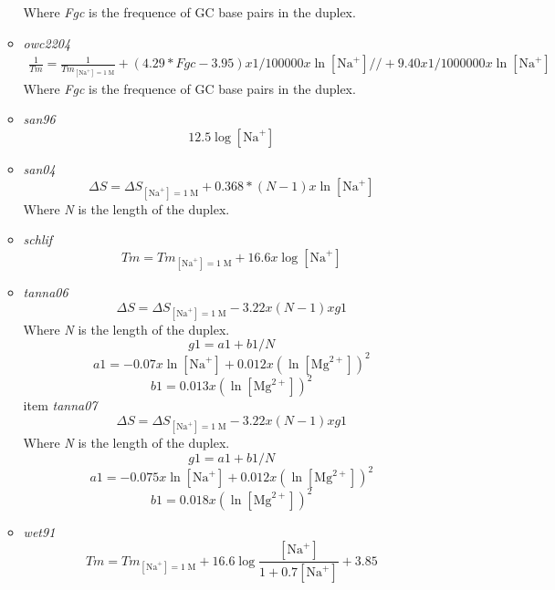 \documentclass{article}
\begin{document}
\begin{itemize}
\begin{itemize}
\begin{displaymath}
 \end{displaymath}
 Where \emph{Fgc} is the frequence of GC base pairs in the duplex.
 \item \textit{owc2204}
 \begin{multline*}
 \frac{1}{Tm}=\frac{1}{Tm_{[\mbox{Na}^+]=1\;\mathrm{M}}}+ (4.29 * Fgc - 3.95) x 1 / 100000 x \ln [\mbox{Na}^+] //
  + 9.40 x 1 / 1000000 x \ln [\mbox{Na}^+]
 \end{multline*}
 Where \emph{Fgc} is the frequence of GC base pairs in the duplex.
 \item \textit{san96}
 \begin{displaymath}
  12.5  \log [\mbox{Na}^+]   
 \end{displaymath}
 \item \textit{san04}
 \begin{displaymath}
  \Delta{}S=\Delta{}S_{[\mbox{Na}^+]=1\;\mathrm{M}}+ 0.368 * (N - 1) x \ln [\mbox{Na}^+]   
 \end{displaymath}
 Where \emph{N} is the length of the duplex.
 \item \textit{schlif}
 \begin{displaymath}
  Tm=Tm_{[\mbox{Na}^+]=1\;\mathrm{M}}+ 16.6 x \log [\mbox{Na}^+]   
 \end{displaymath}
 \item \textit{tanna06}
 \begin{displaymath}
  \Delta{}S=\Delta{}S_{[\mbox{Na}^+]=1\;\mathrm{M}}- 3.22 x (N - 1) x g1  
 \end{displaymath}
 Where \emph{N} is the length of the duplex.
 \begin{displaymath}
  g1=a1 + b1 / N  
 \end{displaymath}
 \begin{displaymath}
  a1= -0.07 x \ln [\mbox{Na}^+] + 0.012 x (\ln [\mbox{Mg}^{2+}])^2  
 \end{displaymath}
 \begin{displaymath}
  b1= 0.013 x (\ln [\mbox{Mg}^{2+}])^2  
 \end{displaymath}
 item \textit{tanna07}
 \begin{displaymath}
  \Delta{}S=\Delta{}S_{[\mbox{Na}^+]=1\;\mathrm{M}}- 3.22 x (N - 1) x g1  
 \end{displaymath}
 Where \emph{N} is the length of the duplex.
 \begin{displaymath}
  g1=a1 + b1 / N  
 \end{displaymath}
 \begin{displaymath}
  a1= -0.075 x \ln [\mbox{Na}^+] + 0.012 x (\ln [\mbox{Mg}^{2+}])^2  
 \end{displaymath}
 \begin{displaymath}
  b1= 0.018 x (\ln [\mbox{Mg}^{2+}])^2  
 \end{displaymath}
 \item \textit{wet91}
 \begin{displaymath}
  Tm=Tm_{[\mbox{Na}^+]=1\;\mathrm{M}}+ 16.6  \log \frac{[\mbox{Na}^+]}{1 + 0.7 [\mbox{Na}^+]} + 3.85    
 \end{displaymath}
 \end{itemize}
 

\end{itemize}
\end{document}
